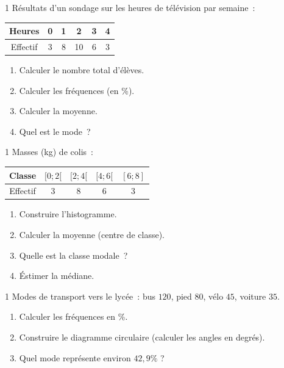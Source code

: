 \begin{exo}{1}
R\'esultats d'un sondage sur les heures de t\'el\'evision par semaine~:
\begin{center}
\begin{tabular}{|c|ccccc|}
\hline
\rowcolor{BN!10}
Heures & 0 & 1 & 2 & 3 & 4 \\
\hline
Effectif & 3 & 8 & 10 & 6 & 3 \\
\hline
\end{tabular}
\end{center}
\begin{enumerate}
  \item Calculer le nombre total d'\'el\`eves.
  \item Calculer les fr\'equences (en \%).
  \item Calculer la moyenne.
  \item Quel est le mode~?
\end{enumerate}
\end{exo}

\begin{exo}{1}
Masses (kg) de colis~:
\begin{center}
\begin{tabular}{|c|c|c|c|c|}
\hline
\rowcolor{BN!10}
Classe & $[0;2[$ & $[2;4[$ & $[4;6[$ & $[6;8]$ \\
\hline
Effectif & 3 & 8 & 6 & 3 \\
\hline
\end{tabular}
\end{center}
\begin{enumerate}
  \item Construire l'histogramme.
  \item Calculer la moyenne (centre de classe).
  \item Quelle est la classe modale~?
  \item \'Estimer la m\'ediane.
\end{enumerate}
\end{exo}

\begin{exo}{1}
Modes de transport vers le lyc\'ee~:
bus $120$, pied $80$, v\'elo $45$, voiture $35$.
\begin{enumerate}
  \item Calculer les fr\'equences en \%.
  \item Construire le diagramme circulaire (calculer les angles en degr\'es).
  \item Quel mode repr\'esente environ $42{,}9\%$ ?
\end{enumerate}
\end{exo}

